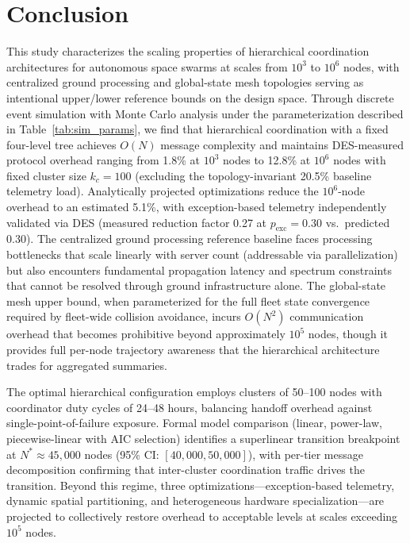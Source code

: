 \documentclass[journal]{IEEEtran}
\begin{document}
\section{Conclusion}

This study characterizes the scaling properties of hierarchical coordination architectures for autonomous space swarms at scales from $10^3$ to $10^6$ nodes, with centralized ground processing and global-state mesh topologies serving as intentional upper/lower reference bounds on the design space. Through discrete event simulation with Monte Carlo analysis under the parameterization described in Table~\ref{tab:sim_params}, we find that hierarchical coordination with a fixed four-level tree achieves $O(N)$ message complexity and maintains DES-measured protocol overhead ranging from 1.8\% at $10^3$ nodes to 12.8\% at $10^6$ nodes with fixed cluster size $k_c = 100$ (excluding the topology-invariant 20.5\% baseline telemetry load). Analytically projected optimizations reduce the $10^6$-node overhead to an estimated 5.1\%, with exception-based telemetry independently validated via DES (measured reduction factor 0.27 at $p_{\text{exc}} = 0.30$ vs.\ predicted 0.30). The centralized ground processing reference baseline faces processing bottlenecks that scale linearly with server count (addressable via parallelization) but also encounters fundamental propagation latency and spectrum constraints that cannot be resolved through ground infrastructure alone. The global-state mesh upper bound, when parameterized for the full fleet state convergence required by fleet-wide collision avoidance, incurs $O(N^2)$ communication overhead that becomes prohibitive beyond approximately $10^5$ nodes, though it provides full per-node trajectory awareness that the hierarchical architecture trades for aggregated summaries.

The optimal hierarchical configuration employs clusters of 50--100 nodes with coordinator duty cycles of 24--48 hours, balancing handoff overhead against single-point-of-failure exposure. Formal model comparison (linear, power-law, piecewise-linear with AIC selection) identifies a superlinear transition breakpoint at $N^* \approx 45{,}000$ nodes (95\% CI: $[40{,}000, 50{,}000]$), with per-tier message decomposition confirming that inter-cluster coordination traffic drives the transition. Beyond this regime, three optimizations---exception-based telemetry, dynamic spatial partitioning, and heterogeneous hardware specialization---are projected to collectively restore overhead to acceptable levels at scales exceeding $10^5$ nodes.
\end{document}
